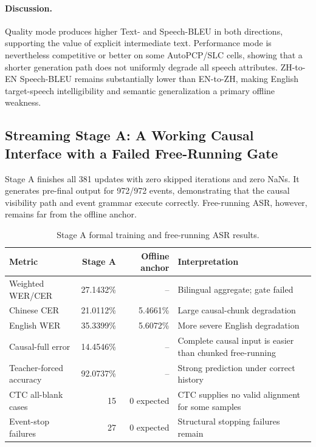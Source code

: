\documentclass[11pt,a4paper]{article}
\begin{document}
\paragraph{Discussion.}
Quality mode produces higher Text- and Speech-BLEU in both directions, supporting the value of explicit intermediate text. Performance mode is nevertheless competitive or better on some AutoPCP/SLC cells, showing that a shorter generation path does not uniformly degrade all speech attributes. ZH-to-EN Speech-BLEU remains substantially lower than EN-to-ZH, making English target-speech intelligibility and semantic generalization a primary offline weakness.

\subsection{Streaming Stage A: A Working Causal Interface with a Failed Free-Running Gate}

Stage A finishes all 381 updates with zero skipped iterations and zero NaNs. It generates pre-final output for 972/972 events, demonstrating that the causal visibility path and event grammar execute correctly. Free-running ASR, however, remains far from the offline anchor.

\begin{table}[H]
\centering
\caption{Stage A formal training and free-running ASR results.}
\label{tab:stagea}
\begin{tabularx}{\textwidth}{lrrY}
\toprule
Metric & Stage A & Offline anchor & Interpretation \\
\midrule
Weighted WER/CER & 27.1432\% & -- & Bilingual aggregate; gate failed \\
Chinese CER & 21.0112\% & 5.4661\% & Large causal-chunk degradation \\
English WER & 35.3399\% & 5.6072\% & More severe English degradation \\
Causal-full error & 14.4546\% & -- & Complete causal input is easier than chunked free-running \\
Teacher-forced accuracy & 92.0737\% & -- & Strong prediction under correct history \\
CTC all-blank cases & 15 & 0 expected & CTC supplies no valid alignment for some samples \\
Event-stop failures & 27 & 0 expected & Structural stopping failures remain \\
\bottomrule
\end{tabularx}
\end{table}
\end{document}
